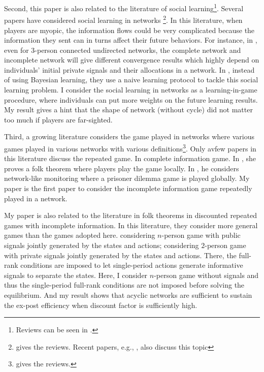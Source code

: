 \documentclass[12pt,letter]{article}
\theoremstyle{definition}
\theoremstyle{remark}
\theoremstyle{claim}
\begin{document}
Second, this paper is also related to the literature of social learning\footnote{Reviews can be seen in \citep{Bikhchandani1998} \citep{Cao2001}.}. Several papers have considered social learning in networks \footnote{\citep{Goyal2012} gives the reviews. Recent papers, e.g., \citep{Acemoglu2011}\citep{Chatterjee2011}, also discuss this topic}. In this literature, when players are myopic, the information flows could be very complicated because the information they sent can in turns affect their future behaviors. For instance, in \citep{RePEc:eee:gamebe:v:45:y:2003:i:2:p:329-346},  even for 3-person connected undirected networks, the complete network and incomplete network will give different convergence results which highly depend on individuals' initial private signals and their allocations in a network. In \citep{Golub2010}, instead of using Bayesian learning, they use a naive learning protocol to tackle this social learning problem. I consider the social learning in networks as a learning-in-game procedure, where individuals can put more weights on the future learning results. My result gives a hint that the shape of network (without cycle) did not matter too much if players are far-sighted.

Third, a growing literature considers the game played in networks where various games played in various networks with various definitions\footnote{\citep{Jackson2008}\citep{Goyal2012} gives the reviews.}. Only avfew papers in this literature discuss the repeated game. In complete information game. In \citep{Laclau2012}, she proves a folk theorem where players play the game locally. In \citep{Wolitzky2013} \citep{Wolitzky2014}, he considers network-like monitoring where a prisoner dilemma game is played globally. My paper is the first paper to consider the incomplete information game repeatedly played in a network. 

My paper is also related to the literature in folk theorems in discounted repeated games with incomplete information. In this literature, they consider more general games than the games adopted here. \citep{Fudenberg2010} \citep{Fudenberg2011} \citep{Wiseman2012} considering $n$-person game with public signals jointly generated by the states and actions; \citep{Yamamoto2014} considering $2$-person game with private signals jointly generated by the states and actions. There, the full-rank conditions are imposed to let single-period actions generate informative signals to separate the states. Here, I consider $n$-person game without signals and thus the single-period full-rank conditions are not imposed before solving the equilibrium.  And my result shows that acyclic networks are sufficient to sustain the ex-post efficiency when discount factor is sufficiently high. 
\end{document}
